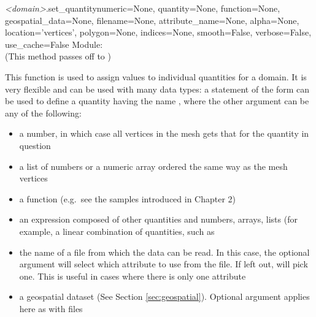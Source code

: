 \documentclass{manual}
\begin{document}
\begin{methoddesc}{\emph{<domain>}.set_quantity}{numeric=None,
                                                 quantity=None,
                                                 function=None,
                                                 geospatial_data=None,
                                                 filename=None,
                                                 attribute_name=None,
                                                 alpha=None,
                                                 location='vertices',
                                                 polygon=None,
                                                 indices=None,
                                                 smooth=False,
                                                 verbose=False,
                                                 use_cache=False}
Module:  \\
(This method passes off to )

This function is used to assign values to individual quantities for a
domain. It is very flexible and can be used with many data types: a
statement of the form  can be used
to define a quantity having the name , where the other
argument  can be any of the following:

\begin{itemize}
  \item a number, in which case all vertices in the mesh gets that for
        the quantity in question
  \item a list of numbers or a numeric array ordered the same way as the mesh vertices
  \item a function (e.g.\ see the samples introduced in Chapter 2)
  \item an expression composed of other quantities and numbers, arrays, lists (for
        example, a linear combination of quantities, such as
  \item the name of a file from which the data can be read. In this case, the optional
        argument  will select which attribute to use from the file. If left out,
         will pick one. This is useful in cases where there is only one attribute
  \item a geospatial dataset (See Section \ref{sec:geospatial}).
        Optional argument  applies here as with files
\end{itemize}


\end{methoddesc}
\end{document}
